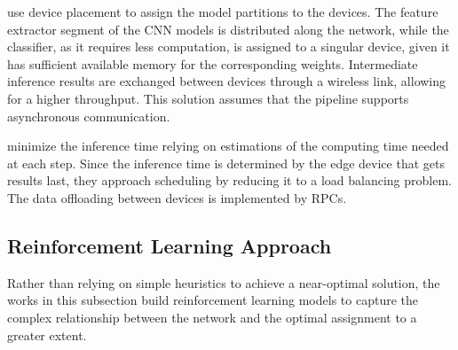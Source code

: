 \begin{description}[style=unboxed, leftmargin=1cm, font=\bfseries]
    \item[\textcite{p_dai_joint_2025}]
    use device placement to assign the model partitions to the devices.
    The feature extractor segment of the \ac{CNN} models is distributed along the
    network, while the classifier, as it requires less computation, is assigned to
    a singular device, given it has sufficient available memory for the corresponding
    weights. Intermediate inference results are exchanged between devices
    through a wireless link, allowing for a higher throughput.
    This solution assumes that the pipeline supports asynchronous communication.

    \item[\textcite{w_miao_adaptive_2020}]
    minimize the inference time relying on estimations of the computing time
    needed at each step. Since the inference time is determined by the
    edge device that gets results last, they approach scheduling by reducing 
    it to a load balancing problem. The data offloading between devices is 
    implemented by \ac{RPC}s.

\end{description}

\subsection{Reinforcement Learning Approach} \label{sec:se322}

Rather than relying on simple heuristics to achieve a near-optimal
solution, the works in this subsection build reinforcement learning models to 
capture the complex relationship between the network and the optimal assignment
to a greater extent. 

